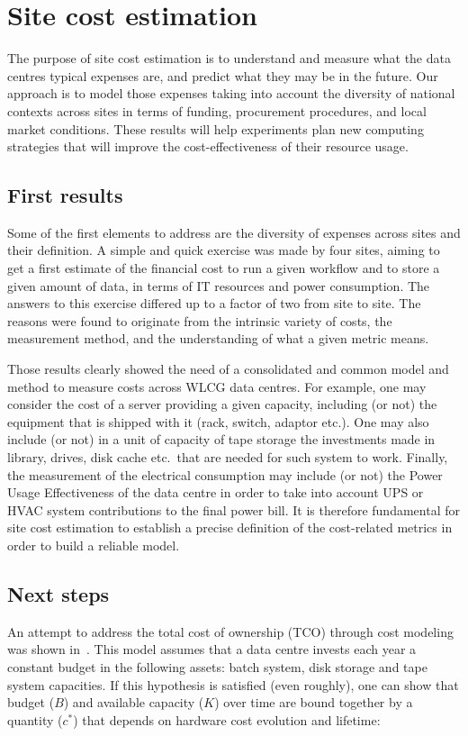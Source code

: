 \section{Site cost estimation}
The purpose of site cost estimation is to understand and measure what
the data centres typical expenses are, and predict what they may be in
the future. Our approach is to model those expenses taking into
account the diversity of national contexts across sites in terms of
funding, procurement procedures, and local market conditions.  These
results will help experiments plan new computing strategies that will
improve the cost-effectiveness of their resource usage.

\subsection{First results}
Some of the first elements to address are the diversity of expenses
across sites and their definition.  A simple and quick exercise was
made by four sites, aiming to get a first estimate of the financial
cost to run a given workflow and to store a given amount of data, in
terms of IT resources and power consumption.  The answers to this
exercise differed up to a factor of two from site to site.
The reasons were found to originate from the intrinsic variety of
costs, the measurement method, and the understanding of what a given
metric means.

Those results clearly showed the need of a consolidated and common
model and method to measure costs across WLCG data centres. For
example, one may consider the cost of a server providing a given
capacity, including (or not) the equipment that is shipped with it
(rack, switch, adaptor etc.).  One may also include (or not) in a unit
of capacity of tape storage the investments made in library, drives,
disk cache etc.\ that are needed for such system to work.  Finally,
the measurement of the electrical consumption may include (or not) the
Power Usage Effectiveness of the data centre in order to take into
account UPS or HVAC system contributions to the final power bill.  It
is therefore fundamental for site cost estimation to establish a
precise definition of the cost-related metrics in order to build a
reliable model.

\subsection{Next steps}
An attempt to address the total cost of ownership (TCO)
through cost modeling was shown in~\cite{costmodel}. This model
assumes that a data centre invests each year a constant budget in the
following assets: batch system, disk storage and tape system
capacities. If this hypothesis is satisfied (even roughly), one can
show that budget ($B$) and available capacity ($K$) over time are
bound together by a quantity ($c^*$) that depends on hardware cost
evolution and lifetime:

